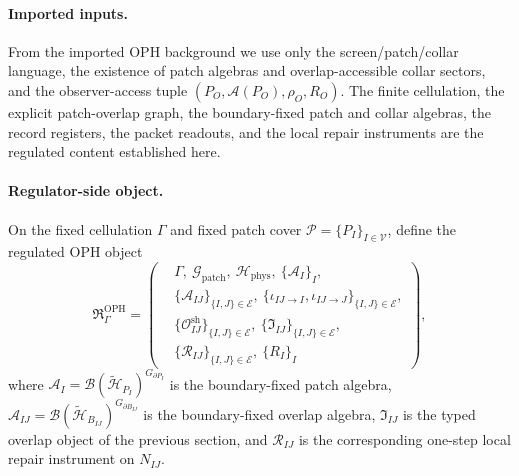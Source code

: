 \documentclass[11pt]{article}
\begin{document}
\paragraph{Imported inputs.}
From the imported OPH background we use only the screen/patch/collar language, the existence of
patch algebras and overlap-accessible collar sectors, and the observer-access tuple
$(P_O,\mathcal A(P_O),\rho_O,R_O)$. The finite cellulation, the explicit patch-overlap graph,
the boundary-fixed patch and collar algebras, the record registers, the packet readouts, and the
local repair instruments are the regulated content established here.

\paragraph{Regulator-side object.}
On the fixed cellulation $\Gamma$ and fixed patch cover $\mathcal P=\{P_I\}_{I\in\mathcal V}$,
define the regulated OPH object
\begin{equation}
\mathfrak R_{\Gamma}^{\mathrm{OPH}}
=
\left(
\begin{aligned}
&\Gamma,\ \mathcal G_{\mathrm{patch}},\ \mathcal H_{\mathrm{phys}},\ \{\mathcal A_I\}_I,\\
&\{\mathcal A_{IJ}\}_{\{I,J\}\in\mathcal E},
\ \{\iota_{IJ\to I},\iota_{IJ\to J}\}_{\{I,J\}\in\mathcal E},\\
&\{\mathcal O_{IJ}^{\mathrm{sh}}\}_{\{I,J\}\in\mathcal E},
\ \{\mathfrak I_{IJ}\}_{\{I,J\}\in\mathcal E},\\
&\{\mathcal R_{IJ}\}_{\{I,J\}\in\mathcal E},\ \{R_I\}_I
\end{aligned}
\right),
\end{equation}
where $\mathcal A_I=\mathcal B(\widetilde{\mathcal H}_{P_I})^{G_{\partial P_I}}$ is the
boundary-fixed patch algebra, $\mathcal A_{IJ}=\mathcal B(\widetilde{\mathcal H}_{B_{IJ}})^
{G_{\partial B_{IJ}}}$ is the boundary-fixed overlap algebra, $\mathfrak I_{IJ}$ is the typed
overlap object of the previous section, and $\mathcal R_{IJ}$ is the corresponding one-step
local repair instrument on $N_{IJ}$.
\end{document}
